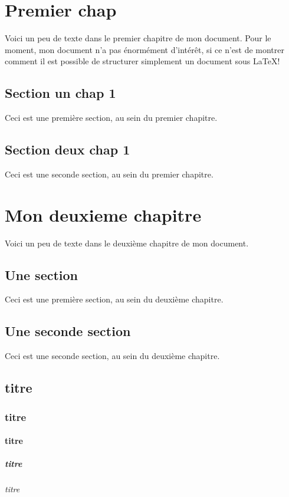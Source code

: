 \documentclass[a4paper,11pt]{report}
\begin{document}
	
	\tableofcontents


\chapter{Premier chap}
Voici un peu de texte dans le premier chapitre de mon document. Pour le
moment, mon document n'a pas énormément d'intérêt, si ce n'est de montrer
comment il est possible de structurer simplement un document sous LaTeX!

\section{Section un chap 1}
Ceci est une première section, au sein du premier chapitre.

\section{Section deux chap 1}
Ceci est une seconde section, au sein du premier chapitre.


\chapter{Mon deuxieme chapitre}
Voici un peu de texte dans le deuxième chapitre de mon
document.

\section{Une section}
Ceci est une première section, au sein du
deuxième chapitre.

\section{Une seconde section}
Ceci est une seconde section, au sein du
deuxième chapitre.

\section{titre}

\subsection{titre}
\subsubsection{titre}
\paragraph{titre}
\subparagraph{titre}
\end{document}

